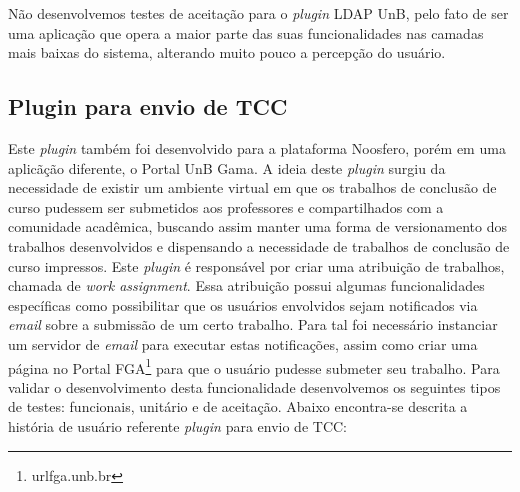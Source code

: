 Não desenvolvemos testes de aceitação para o \textit{plugin} LDAP UnB, pelo fato de ser uma aplicação que opera a maior parte das suas funcionalidades nas camadas mais baixas do sistema, alterando muito pouco a percepção do usuário.

\subsection{Plugin para envio de TCC}

Este \textit{plugin} também foi desenvolvido para a plataforma Noosfero, porém em uma aplicãção diferente, o Portal UnB Gama. A ideia deste \textit{plugin} surgiu da necessidade de existir um ambiente virtual em que os trabalhos de conclusão de curso pudessem ser submetidos aos professores e compartilhados com a comunidade acadêmica, buscando assim manter uma forma de versionamento dos trabalhos desenvolvidos e dispensando a necessidade de trabalhos de conclusão de curso impressos.
%
Este \textit{plugin} é responsável por criar uma atribuição de trabalhos, chamada de \textit{work assignment}. Essa atribuição possui algumas funcionalidades específicas como possibilitar que os usuários envolvidos sejam notificados via \textit{email} sobre a submissão de um certo trabalho. Para tal foi necessário instanciar um servidor de \textit{email} para executar estas notificações, assim como criar uma página no Portal FGA\footnote{url{fga.unb.br}} para que o usuário pudesse submeter seu trabalho.
%
Para validar o desenvolvimento desta funcionalidade desenvolvemos os seguintes tipos de testes: funcionais, unitário e de aceitação. Abaixo encontra-se descrita a história de usuário referente \textit{plugin} para envio de TCC:

